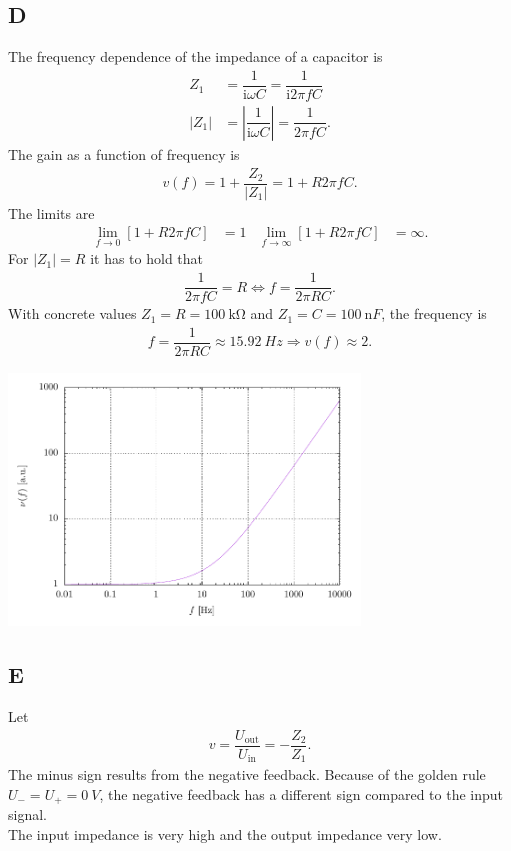 \documentclass[a4paper,10pt]{article}
\newenvironment{Figure}
        {\par\medskip\noindent\minipage{\linewidth}}
        {\endminipage\par\medskip}
\numberwithin{equation}{section}
\begin{document}
\begin{multicols}{2}
	\subsection{D}
	The frequency dependence of the impedance of a capacitor is
	\begin{align}
		Z_1   & = \dfrac{1}{\text{i}\omega C}=\dfrac{1}{\text{i}2\pi fC}        \\
		|Z_1| & = \left|\dfrac{1}{\text{i}\omega C}\right| = \dfrac{1}{2\pi fC}
		.\end{align}
	The gain as a function of frequency is
	\begin{align}
		v\left(f\right)=1+\dfrac{Z_2}{|Z_1|}=1+R2\pi fC
		.\end{align}
	The limits are
	\begin{align}
		\lim_{f \rightarrow 0}\left[1+R2\pi fC\right] & = 1 & \lim_{f \rightarrow \infty}\left[1+R2\pi fC\right] & = \infty
		.\end{align}
	For $|Z_1| = R$ it has to hold that
	\begin{align}
		\dfrac{1}{2\pi fC}=R\Leftrightarrow f=\dfrac{1}{2\pi RC}
		.\end{align}
	With concrete values $Z_1=R=\SI{100}{\kilo\ohm}$ and $Z_1=C=\SI{100}{\nano F}$, the frequency is
	\begin{align}
		f=\dfrac{1}{2\pi RC}\approx \SI{15.92}{Hz}\Rightarrow v\left(f\right)\approx 2
		.\end{align}
	\begin{Figure}
		\centering
		\includegraphics[width=0.7\textwidth]{../plot/preE_crop.pdf}
	\end{Figure}

	\subsection{E}
	Let
	\begin{align}
		v=\dfrac{U_\text{out}}{U_\text{in}}=-\dfrac{Z_2}{Z_1}
		.\end{align}
	The minus sign results from the negative feedback.
	Because of the golden rule $U_-=U_+=\SI{0}{V}$, the negative feedback has a different sign compared to the input signal.
	\\\indent The input impedance is very high and the output impedance very low.


\end{multicols}
\end{document}
